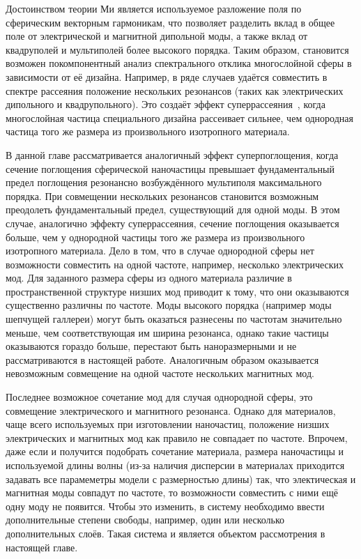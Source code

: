 Достоинством теории Ми является используемое разложение поля по
сферическим векторным гармоникам, что позволяет разделить вклад в
общее поле от электрической и магнитной дипольной моды, а также вклад
от квадруполей и мультиполей более высокого порядка. Таким образом,
становится возможен покомпонентный анализ спектрального отклика
многослойной сферы в зависимости от её дизайна. Например, в ряде
случаев удаётся совместить в спектре рассеяния положение нескольких
резонансов (таких как электрических дипольного и квадрупольного). Это
создаёт эффект суперрассеяния~\cite{Fan-2010,Fan-2011}, когда
многослойная частица специального дизайна рассеивает сильнее, чем
однородная частица того же размера из произвольного изотропного
материала.

В данной главе рассматривается аналогичный эффект суперпоглощения,
когда сечение поглощения сферической наночастицы превышает
фундаментальный предел поглощения резонансно возбуждённого мультиполя
максимального порядка.  При совмещении нескольких резонансов
становится возможным преодолеть фундаментальный предел, существующий
для одной моды.  В этом случае, аналогично эффекту суперрассеяния,
сечение поглощения оказывается больше, чем у однородной частицы того
же размера из произвольного изотропного материала. Дело в том, что в
случае однородной сферы нет возможности совместить на одной частоте,
например, несколько электрических мод. Для заданного размера сферы из
одного материала различие в пространственной структуре низших мод
приводит к тому, что они оказываются существенно различны по
частоте. Моды высокого порядка (например моды шепчущей галлереи) могут
быть оказаться разнесены по частотам значительно меньше, чем
соответствующая им ширина резонанса, однако такие частицы оказываются
гораздо больше, перестают быть наноразмерными и не рассматриваются в
настоящей работе. Аналогичным образом оказывается невозможным
совмещение на одной частоте нескольких магнитных мод.

Последнее возможное сочетание мод для случая однородной сферы, это
совмещение электрического и магнитного резонанса. Однако для
материалов, чаще всего используемых при изготовлении наночастиц,
положение низших электрических и магнитных мод как правило не
совпадает по частоте.  Впрочем, даже если и получится подобрать
сочетание материала, размера наночастицы и используемой длины волны
(из-за наличия дисперсии в материалах приходится задавать все
парамеметры модели с размерностью длины) так, что электическая и
магнитная моды совпадут по частоте, то возможности совместить с ними
ещё одну моду не появится.  Чтобы это изменить, в систему необходимо
ввести дополнительные степени свободы, например, один или несколько
дополнительных слоёв. Такая система и является объектом рассмотрения в
настоящей главе.

